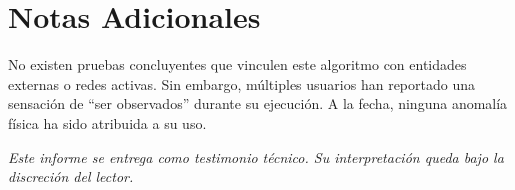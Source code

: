\documentclass[12pt]{article}
\begin{document}
\section*{Notas Adicionales}

No existen pruebas concluyentes que vinculen este algoritmo con entidades externas o redes activas. Sin embargo, múltiples usuarios han reportado una sensación de “ser observados” durante su ejecución. A la fecha, ninguna anomalía física ha sido atribuida a su uso.

\vspace{1cm}
\begin{center}
\textit{Este informe se entrega como testimonio técnico. Su interpretación queda bajo la discreción del lector.}
\end{center}
\end{document}
